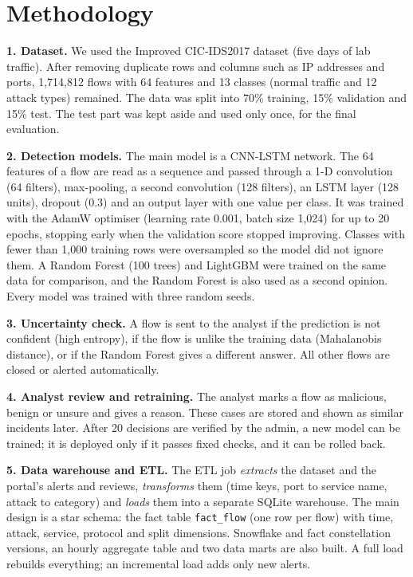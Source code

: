 \documentclass[11pt,a4paper]{article}
\begin{document}
\section{Methodology}
\textbf{1. Dataset.} We used the Improved CIC-IDS2017 dataset (five days of lab traffic). After
removing duplicate rows and columns such as IP addresses and ports, 1,714,812 flows with 64
features and 13 classes (normal traffic and 12 attack types) remained. The data was split into
70\% training, 15\% validation and 15\% test. The test part was kept aside and used only once,
for the final evaluation.

\textbf{2. Detection models.} The main model is a CNN-LSTM network. The 64 features of a flow are
read as a sequence and passed through a 1-D convolution (64 filters), max-pooling, a second
convolution (128 filters), an LSTM layer (128 units), dropout (0.3) and an output layer with one
value per class. It was trained with the AdamW optimiser (learning rate 0.001, batch size 1,024)
for up to 20 epochs, stopping early when the validation score stopped improving. Classes with
fewer than 1,000 training rows were oversampled so the model did not ignore them. A Random Forest
(100 trees) and LightGBM were trained on the same data for comparison, and the Random Forest is
also used as a second opinion. Every model was trained with three random seeds.

\textbf{3. Uncertainty check.} A flow is sent to the analyst if the prediction is not confident
(high entropy), if the flow is unlike the training data (Mahalanobis distance), or if the Random
Forest gives a different answer. All other flows are closed or alerted automatically.

\textbf{4. Analyst review and retraining.} The analyst marks a flow as malicious, benign or
unsure and gives a reason. These cases are stored and shown as similar incidents later. After
20 decisions are verified by the admin, a new model can be trained; it is deployed only if it
passes fixed checks, and it can be rolled back.

\textbf{5. Data warehouse and ETL.} The ETL job \emph{extracts} the dataset and the portal's alerts
and reviews, \emph{transforms} them (time keys, port to service name, attack to category) and
\emph{loads} them into a separate SQLite warehouse. The main design is a star schema: the fact
table \texttt{fact\_flow} (one row per flow) with time, attack, service, protocol and split
dimensions. Snowflake and fact constellation versions, an hourly aggregate table and two data marts
are also built. A full load rebuilds everything; an incremental load adds only new alerts.
\end{document}
